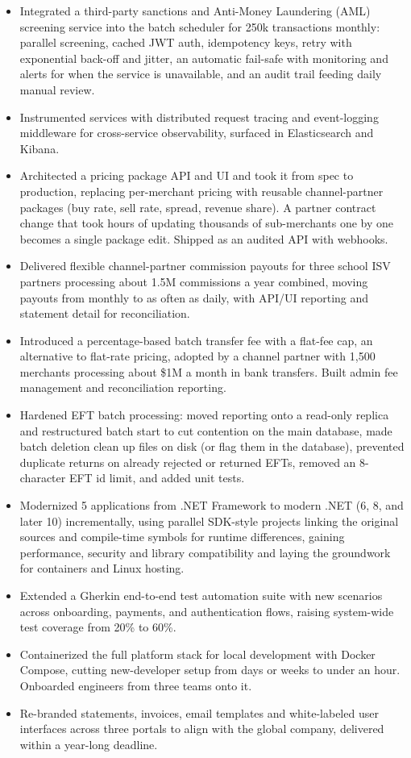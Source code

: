 \documentclass[10.5pt]{article}
\begin{document}
\begin{itemize}
  \item Integrated a third-party sanctions and Anti-Money Laundering (AML) screening service into the batch scheduler for 250k transactions monthly: parallel screening, cached JWT auth, idempotency keys, retry with exponential back-off and jitter, an automatic fail-safe with monitoring and alerts for when the service is unavailable, and an audit trail feeding daily manual review.
  \item Instrumented services with distributed request tracing and event-logging middleware for cross-service observability, surfaced in Elasticsearch and Kibana.
  \item Architected a pricing package API and UI and took it from spec to production, replacing per-merchant pricing with reusable channel-partner packages (buy rate, sell rate, spread, revenue share). A partner contract change that took hours of updating thousands of sub-merchants one by one becomes a single package edit. Shipped as an audited API with webhooks.
  \item Delivered flexible channel-partner commission payouts for three school ISV partners processing about 1.5M commissions a year combined, moving payouts from monthly to as often as daily, with API/UI reporting and statement detail for reconciliation.
  \item Introduced a percentage-based batch transfer fee with a flat-fee cap, an alternative to flat-rate pricing, adopted by a channel partner with 1,500 merchants processing about \$1M a month in bank transfers. Built admin fee management and reconciliation reporting.
  \item Hardened EFT batch processing: moved reporting onto a read-only replica and restructured batch start to cut contention on the main database, made batch deletion clean up files on disk (or flag them in the database), prevented duplicate returns on already rejected or returned EFTs, removed an 8-character EFT id limit, and added unit tests.
  \item Modernized 5 applications from .NET Framework to modern .NET (6, 8, and later 10) incrementally, using parallel SDK-style projects linking the original sources and compile-time symbols for runtime differences, gaining performance, security and library compatibility and laying the groundwork for containers and Linux hosting.
  \item Extended a Gherkin end-to-end test automation suite with new scenarios across onboarding, payments, and authentication flows, raising system-wide test coverage from 20\% to 60\%.
  \item Containerized the full platform stack for local development with Docker Compose, cutting new-developer setup from days or weeks to under an hour. Onboarded engineers from three teams onto it.
  \item Re-branded statements, invoices, email templates and white-labeled user interfaces across three portals to align with the global company, delivered within a year-long deadline.
\end{itemize}
\end{document}
